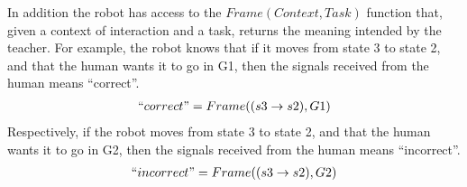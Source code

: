In addition the robot has access to the $Frame(Context,Task)$ function that, given a context of interaction and a task, returns the meaning intended by the teacher. For example, the robot knows that if it moves from state 3 to state 2, and that the human wants it to go in G1, then the signals received from the human means ``correct''.
%
\begin{eqnarray}
``correct" = Frame((s3 \rightarrow s2), G1) \nonumber
\end{eqnarray}
%
Respectively, if the robot moves from state 3 to state 2, and that the human wants it to go in G2, then the signals received from the human means ``incorrect''.
%
\begin{eqnarray}
``incorrect" = Frame((s3 \rightarrow s2), G2) \nonumber
\end{eqnarray}






